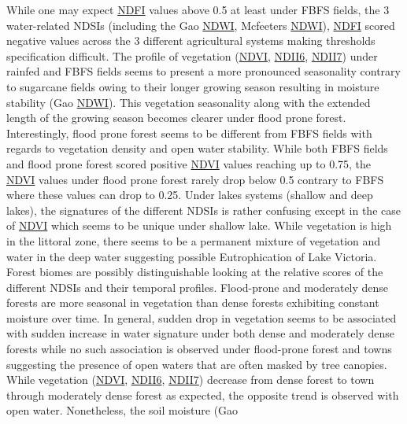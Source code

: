 \documentclass[12pt,oneside]{article}
\begin{document}
While one may expect \href{http://journals.plos.org/plosone/article/file?id=10.1371/journal.pone.0088741\&type=printable}{NDFI} values above 0.5 at least under FBFS fields, the 3 water-related NDSIs (including the Gao \href{https://en.wikipedia.org/wiki/Normalized_difference_water_index}{NDWI}, Mcfeeters \href{https://en.wikipedia.org/wiki/Normalized_difference_water_index}{NDWI}), \href{http://journals.plos.org/plosone/article/file?id=10.1371/journal.pone.0088741\&type=printable}{NDFI} scored negative values across the 3 different agricultural systems making thresholds specification difficult. The profile of vegetation (\href{https://www.sciencedirect.com/science/article/pii/0034425779900130?via\%3Dihub}{NDVI}, \href{https://www.sciencedirect.com/science/article/pii/0034425789900461?via\%3Dihub}{NDII6}, \href{https://www.sciencedirect.com/science/article/pii/0034425789900461?via\%3Dihub}{NDII7}) under rainfed and FBFS fields seems to present a more pronounced seasonality contrary to sugarcane fields owing to their longer growing season resulting in moisture stability (Gao \href{https://en.wikipedia.org/wiki/Normalized_difference_water_index}{NDWI}). This vegetation seasonality along with the extended length of the growing season becomes clearer under flood prone forest. Interestingly, flood prone forest seems to be different from FBFS fields with regards to vegetation density and open water stability. While both FBFS fields and flood prone forest scored positive \href{https://www.sciencedirect.com/science/article/pii/0034425779900130?via\%3Dihub}{NDVI} values reaching up to 0.75, the \href{https://www.sciencedirect.com/science/article/pii/0034425779900130?via\%3Dihub}{NDVI} values under flood prone forest rarely drop below 0.5 contrary to FBFS where these values can drop to 0.25. Under lakes systems (shallow and deep lakes), the signatures of the different NDSIs is rather confusing except in the case of \href{https://www.sciencedirect.com/science/article/pii/0034425779900130?via\%3Dihub}{NDVI} which seems to be unique under shallow lake. While vegetation is high in the littoral zone, there seems to be a permanent mixture of vegetation and water in the deep water suggesting possible Eutrophication of Lake Victoria. Forest biomes are possibly distinguishable looking at the relative scores of the different NDSIs and their temporal profiles. Flood-prone and moderately dense forests are more seasonal in vegetation than dense forests exhibiting constant moisture over time. In general, sudden drop in vegetation seems to be associated with sudden increase in water signature under both dense and moderately dense forests while no such association is observed under flood-prone forest and towns suggesting the presence of open waters that are often masked by tree canopies. While vegetation (\href{https://www.sciencedirect.com/science/article/pii/0034425779900130?via\%3Dihub}{NDVI}, \href{https://www.sciencedirect.com/science/article/pii/0034425789900461?via\%3Dihub}{NDII6}, \href{https://www.sciencedirect.com/science/article/pii/0034425789900461?via\%3Dihub}{NDII7}) decrease from dense forest to town through moderately dense forest as expected, the opposite trend is observed with open water. Nonetheless, the soil moisture (Gao 
\end{document}
